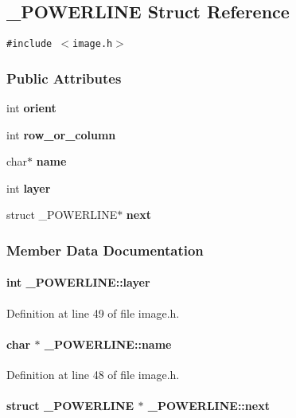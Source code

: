 \subsection{\_\-POWERLINE  Struct Reference}
\label{_POWERLINE}
{\tt \#include $<$image.h$>$}

\subsubsection*{Public Attributes}
\begin{CompactItemize}
\item 
int {\bf orient}
\item 
int {\bf row\_\-or\_\-column}
\item 
char$\ast$ {\bf name}
\item 
int {\bf layer}
\item 
struct \_\-POWERLINE$\ast$ {\bf next}
\end{CompactItemize}


\subsubsection{Member Data Documentation}
\label{_POWERLINE_m3}
\paragraph{\setlength{\rightskip}{0pt plus 5cm}int \_\-POWERLINE::layer}\hfill



Definition at line 49 of file image.h.\label{_POWERLINE_m2}
\paragraph{\setlength{\rightskip}{0pt plus 5cm}char $\ast$ \_\-POWERLINE::name}\hfill



Definition at line 48 of file image.h.\label{_POWERLINE_m4}
\paragraph{\setlength{\rightskip}{0pt plus 5cm}struct \_\-POWERLINE $\ast$ \_\-POWERLINE::next}\hfill



